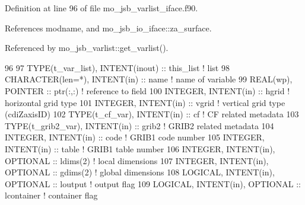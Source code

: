 Definition at line 96 of file mo\+\_\+jsb\+\_\+varlist\+\_\+iface.\+f90.



References modname, and mo\+\_\+jsb\+\_\+io\+\_\+iface\+::za\+\_\+surface.



Referenced by mo\+\_\+jsb\+\_\+varlist\+::get\+\_\+varlist().


\begin{DoxyCode}
96 
97     \textcolor{keywordtype}{TYPE}(t\_var\_list),     \textcolor{keywordtype}{INTENT(inout)}        :: this\_list           \textcolor{comment}{! list}
98     \textcolor{keywordtype}{CHARACTER(len=*)},     \textcolor{keywordtype}{INTENT(in)}           :: name                \textcolor{comment}{! name of variable}
99     \textcolor{keywordtype}{REAL(wp)},             \textcolor{keywordtype}{POINTER}              :: ptr(:,:)            \textcolor{comment}{! reference to field}
100     \textcolor{keywordtype}{INTEGER},              \textcolor{keywordtype}{INTENT(in)}           :: hgrid               \textcolor{comment}{! horizontal grid type}
101     \textcolor{keywordtype}{INTEGER},              \textcolor{keywordtype}{INTENT(in)}           :: vgrid               \textcolor{comment}{! vertical grid type (cdiZaxisID)}
102     \textcolor{keywordtype}{TYPE}(t\_cf\_var),       \textcolor{keywordtype}{INTENT(in)}           :: cf                  \textcolor{comment}{! CF related metadata}
103     \textcolor{keywordtype}{TYPE}(t\_grib2\_var),    \textcolor{keywordtype}{INTENT(in)}           :: grib2               \textcolor{comment}{! GRIB2 related metadata}
104     \textcolor{keywordtype}{INTEGER},              \textcolor{keywordtype}{INTENT(in)}           :: code                \textcolor{comment}{! GRIB1 code number}
105     \textcolor{keywordtype}{INTEGER},              \textcolor{keywordtype}{INTENT(in)}           :: table               \textcolor{comment}{! GRIB1 table number}
106     \textcolor{keywordtype}{INTEGER},              \textcolor{keywordtype}{INTENT(in)}, \textcolor{keywordtype}{OPTIONAL} :: ldims(2)            \textcolor{comment}{! local dimensions}
107     \textcolor{keywordtype}{INTEGER},              \textcolor{keywordtype}{INTENT(in)}, \textcolor{keywordtype}{OPTIONAL} :: gdims(2)            \textcolor{comment}{! global dimensions}
108     \textcolor{keywordtype}{LOGICAL},              \textcolor{keywordtype}{INTENT(in)}, \textcolor{keywordtype}{OPTIONAL} :: loutput             \textcolor{comment}{! output flag}
109     \textcolor{keywordtype}{LOGICAL},              \textcolor{keywordtype}{INTENT(in)}, \textcolor{keywordtype}{OPTIONAL} :: lcontainer          \textcolor{comment}{! container flag}

\end{DoxyCode}
